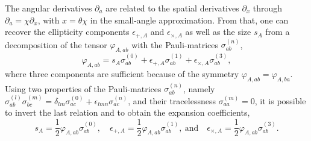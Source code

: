 \documentclass[a4paper,fleqn,usenatbib]{mnras}
\begin{document}
The angular derivatives $\partial_a$ are related to the spatial derivatives $\partial_x$ through $\partial_a = \chi\partial_x$, with $x=\theta\chi$ in the small-angle approximation. From that, one can recover the ellipticity components $\epsilon_{+,A}$ and $\epsilon_{\times,A}$ as well as the size $s_A$ from a decomposition of the tensor $\varphi_{A,ab}$ with the Pauli-matrices $\sigma_{ab}^{(n)}$,
\begin{equation}
\varphi_{A,ab} = s_A\sigma^{(0)}_{ab} + \epsilon_{+,A}\sigma^{(1)}_{ab} + \epsilon_{\times,A}\sigma^{(3)}_{ab},
\end{equation}
where three components are sufficient because of the symmetry $\varphi_{A,ab} = \varphi_{A,ba}$. Using two properties of the Pauli-matrices $\sigma_{ab}^{(n)}$, namely $\sigma_{ab}^{(l)}\sigma_{bc}^{(m)} = \delta_{lm}\sigma^{(0)}_{ac} + \epsilon_{lmn}\sigma^{(n)}_{ac}$, and their tracelessness $\sigma^{(m)}_{aa} = 0$, it is possible to invert the last relation and to obtain the expansion coefficients,
\begin{equation}
s_A = \frac{1}{2}\varphi_{A,ab}\sigma^{(0)}_{ab},
\quad
\epsilon_{+,A} = \frac{1}{2}\varphi_{A,ab}\sigma^{(1)}_{ab},
\mathrm{~and}\quad
\epsilon_{\times,A} = \frac{1}{2}\varphi_{A,ab}\sigma^{(3)}_{ab}.
\end{equation}
\end{document}
